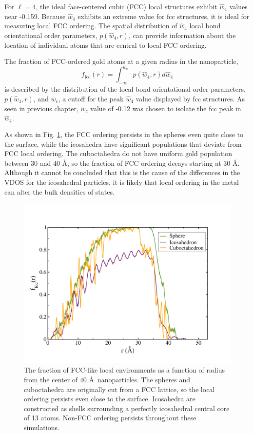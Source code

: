 For $\ell=4$, the ideal face-centered cubic (FCC) local structures
exhibit $\hat{w}_4$ values near -0.159. Because $\hat{w}_4$ exhibits
an extreme value for fcc structures, it is ideal for measuring local
FCC ordering. The spatial distribution of $\hat{w}_4$ local bond
orientational order parameters, $p(\hat{w}_4 , r)$, can provide
information about the location of individual atoms that are central to
local FCC ordering.

The fraction of FCC-ordered gold atoms at a given radius in the
nanoparticle,
\begin{equation}
        f_\mathrm{fcc}(r) = \int_{-\infty}^{w_c} p(\hat{w}_4, r) d \hat{w}_4
\end{equation}
is described by the distribution of the local bond orientational order
parameters, $p(\hat{w}_4, r)$, and $w_c$, a cutoff for the peak
$\hat{w}_4$ value displayed by fcc structures. As seen in previous
chapter,\cite{Stocker2016} $w_c$ value of -0.12 was chosen to isolate the
fcc peak in $\hat{w}_4$.

As shown in Fig. \ref{fig:struct-bowr}, the FCC ordering persists in
the spheres even quite close to the surface, while the icosahedra have
significant populations that deviate from FCC local ordering.  The
cuboctahedra do not have uniform gold population between 30 and 40
\AA, so the fraction of FCC ordering decays starting at 30 \AA.
Although it cannot be concluded that this is the cause of the differences
in the VDOS for the icosahedral particles, it is likely that local
ordering in the metal can alter the bulk densities of states.

\begin{figure}[!htb]
        \includegraphics[width=5in]{figures/struct-bowr.pdf}
        \caption{The fraction of FCC-like local environments as a
          function of radius from the center of 40 \AA\ nanoparticles.
          The spheres and cuboctahedra are originally cut from a FCC
          lattice, so the local ordering persists even close to the
          surface.  Icosahedra are constructed as shells surrounding a
          perfectly icosahedral central core of 13 atoms. Non-FCC
          ordering persists throughout these simulations.}
        \label{fig:struct-bowr}
 \end{figure}

